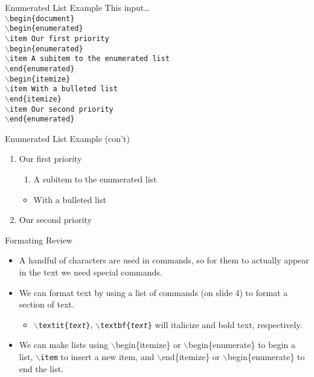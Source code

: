 \documentclass[pdf]{prosper}
\begin{document}
\begin{slide}{Enumerated List Example}
This input\ldots \\
			\texttt{$\backslash$begin\{document\}} \\
			\texttt{$\backslash$begin\{enumerated\}} \\
			\texttt{$\backslash$item Our first priority} \\
			\texttt{$\backslash$begin\{enumerated\}} \\
			\texttt{$\backslash$item A subitem to the enumerated list} \\
			\texttt{$\backslash$end\{enumerated\}} \\
			\texttt{$\backslash$begin\{itemize\}} \\
			\texttt{$\backslash$item With a bulleted list} \\
			\texttt{$\backslash$end\{itemize\}} \\			
			\texttt{$\backslash$item Our second priority} \\
			\texttt{$\backslash$end\{enumerated\}} \\
\end{slide}
\begin{slide}{Enumerated List Example (con't)}
	\begin{enumerate}
		\item Our first priority
			\begin{enumerate}
				\item A subitem to the enumerated list
			\end{enumerate}
			\begin{itemize}
				\item With a bulleted list
			\end{itemize}
		\item Our second priority
	\end{enumerate}
\end{slide}
\begin{slide}{Formating Review}
	\begin{itemize}
		\item A handful of characters are used in commands, so for them to actually appear in the text we need special commands.
		\item We can format text by using a list of commands (on slide 4) to format a section of text.
			\begin{itemize}
				\item \texttt{$\backslash$textit\{\textit{text}\}}, \texttt{$\backslash$textbf\{\textit{text}\}} will italicize and bold text, respectively.
			\end{itemize}
		\item We can make lists using $\backslash$begin\{itemize\} or $\backslash$begin\{enumerate\} to begin a list, \texttt{$\backslash$item} to insert a new item, and $\backslash$end\{itemize\} or $\backslash$begin\{enumerate\} to end the list.
	\end{itemize}
\end{slide}
\end{document}
